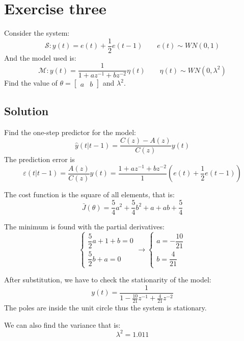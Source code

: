 \section{Exercise three}

Consider the system: 
\[\mathcal{S}:y(t)=e(t)+\dfrac{1}{2}e(t-1)\qquad e(t)\sim WN(0,1)\]
And the model used is: 
\[\mathcal{M}:y(t)=\dfrac{1}{1+az^{-1}+bz^{-2}}\eta(t)\qquad \eta(t)\sim WN(0,\lambda^2)\]
Find the value of $\theta=\begin{bmatrix} a & b \end{bmatrix}$ and $\lambda^2$. 

\subsection{Solution}
Find the one-step predictor for the model: 
\[\hat{y}(t|t-1)=\dfrac{C(z)-A(z)}{C(z)}y(t)\]
The prediction error is
\[\varepsilon(t|t-1)=\dfrac{A(z)}{C(z)}y(t)=\dfrac{1+az^{-1}+bz^{-2}}{1}\left(e(t)+\dfrac{1}{2}e(t-1)\right)\]

The cost function is the square of all elements, that is: 
\[\bar{J}(\theta)=\dfrac{5}{4}a^2+\dfrac{5}{4}b^2+a+ab+\dfrac{5}{4}\]

The minimum is found with the partial derivatives: 
\[\begin{cases}
    \dfrac{5}{2}a+1+b=0 \\
    \dfrac{5}{2}b+a=0
\end{cases} \rightarrow \begin{cases}
    a=-\dfrac{10}{21} \\
    b=\dfrac{4}{21}
\end{cases}\]

After substitution, we have to check the stationarity of the model: 
\[y(t)=\dfrac{1}{1-\frac{10}{21}z^{-1}+\frac{4}{21}z^{-2}}\]
The poles are inside the unit circle thus the system is stationary. 

We can also find the variance that is: 
\[\lambda^2=1.011\]